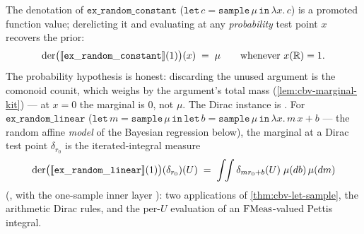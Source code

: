 \begin{theorem}%
\label{thm:cbv-basic-marginals}
\rocqok
{}\rocqok
{}\rocqok
{}
The denotation of $\mathtt{ex\_random\_constant}$
($\mathtt{let}\,c = \mathtt{sample}\,\mu\,\mathtt{in}\,\lambda x.\,c$)
is a promoted function value; derelicting it and evaluating at any
\emph{probability} test point $x$ recovers the prior:
\[
  \mathrm{der}\bigl([\![ \mathtt{ex\_random\_constant} ]\!](1)\bigr)(x)
  \;=\; \mu
  \qquad\text{whenever } x(\mathbb{R}) = 1.
\]
The probability hypothesis is honest: discarding the unused argument
is the comonoid counit, which weighs by the argument's total mass
(\autoref{lem:cbv-marginal-kit}) --- at $x = 0$ the marginal is $0$,
not $\mu$. The Dirac instance is
.
For $\mathtt{ex\_random\_linear}$
($\mathtt{let}\,m = \mathtt{sample}\,\mu\,\mathtt{in}\,
\mathtt{let}\,b = \mathtt{sample}\,\mu\,\mathtt{in}\,
\lambda x.\,m\,x + b$ --- the random affine \emph{model} of the
Bayesian regression below), the marginal at a Dirac test point
$\delta_{r_0}$ is the iterated-integral measure
\[
  \mathrm{der}\bigl([\![ \mathtt{ex\_random\_linear} ]\!](1)\bigr)
    (\delta_{r_0})(U)
  \;=\;
  \int\!\!\int \delta_{m r_0 + b}(U)\;\mu(db)\,\mu(dm)
\]
(,
with the one-sample inner layer
):
two applications of \autoref{thm:cbv-let-sample}, the arithmetic
Dirac rules, and the per-$U$ evaluation of an $\mathrm{FMeas}$-valued Pettis
integral.
\end{theorem}

